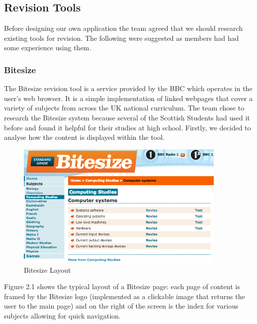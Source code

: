 \documentclass{l3proj}
\begin{document}
\subsection{Revision Tools}

Before designing our own application the team agreed that we should
research existing tools for revision. The following were suggested as
members had had some experience using them. 

\subsubsection{Bitesize}
The Bitesize revision tool is a service provided by the BBC which
operates in the user's web browser. It is a simple implementation of
linked webpages that cover a variety of subjects from across the UK
national curriculum. The team chose to research the Bitesize system
because several of the Scottish Students had used it before and found
it helpful for their studies at high school. Firstly, we decided to analyse how the
content is displayed within the tool.

\begin{figure}[!htb]
\caption{Bitesize Layout}
 \centering
\includegraphics[width=0.9\textwidth]{images/Bitesize/BitesizeLayout.png}
\end{figure}

Figure 2.1 shows the typical layout of a Bitesize page: each page of
content is framed by the Bitesize logo (implemented as a clickable image that
returns the user to the main page) and on the right of the screen is
the index for various subjects allowing for quick navigation.
\end{document}
